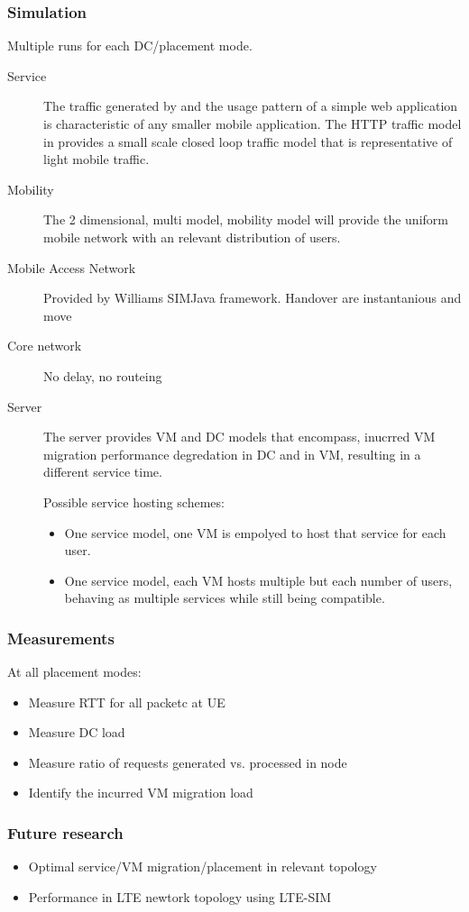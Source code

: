 \subsubsection{Simulation}
Multiple runs for each DC/\xcloud placement mode.
\begin{description}
\item[Service]
The traffic generated by and the usage pattern of a simple web application is characteristic of any smaller mobile application. The HTTP traffic model in \cite{liu2001traffic} provides a small scale closed loop traffic model that is representative of light mobile traffic.

\item[Mobility]
The 2 dimensional, multi model, mobility model \cite{bettstetter2001smooth} will provide the uniform mobile network with an relevant distribution of users.

\item[Mobile Access Network] Provided by Williams SIMJava framework. Handover are instantanious and move 

\item[Core network] No delay, no routeing

\item[Server] The server provides VM and DC models that encompass, inucrred VM migration performance degredation in DC and in VM, resulting in a different service time.

Possible service hosting schemes:
\begin{itemize}
\item One service model, one VM is empolyed to host that service for each user.
\item One service model, each VM hosts multiple but each number of users, behaving as multiple services while still being compatible.
\end{itemize}

\end{description}

\subsubsection{Measurements}
At all placement modes:
\begin{itemize}
\item Measure RTT for all packetc at UE
\item Measure DC load
\item Measure ratio of requests generated vs. processed in \xcloud node
\item Identify the incurred VM migration load
\end{itemize}

\subsubsection{Future research}
\begin{itemize}
\item Optimal service/VM migration/placement in relevant topology
\item Performance in LTE newtork topology using LTE-SIM \cite{5634134}
\end{itemize}